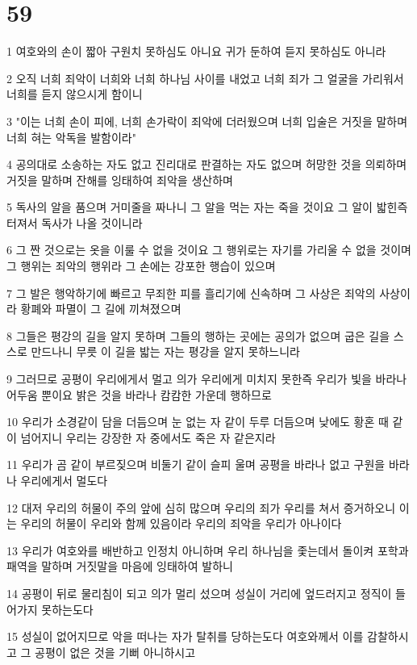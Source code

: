 \chapter{59}

\par 1 여호와의 손이 짧아 구원치 못하심도 아니요 귀가 둔하여 듣지 못하심도 아니라
\par 2 오직 너희 죄악이 너희와 너희 하나님 사이를 내었고 너희 죄가 그 얼굴을 가리워서 너희를 듣지 않으시게 함이니
\par 3 "이는 너희 손이 피에, 너희 손가락이 죄악에 더러웠으며 너희 입술은 거짓을 말하며 너희 혀는 악독을 발함이라"
\par 4 공의대로 소송하는 자도 없고 진리대로 판결하는 자도 없으며 허망한 것을 의뢰하며 거짓을 말하며 잔해를 잉태하여 죄악을 생산하며
\par 5 독사의 알을 품으며 거미줄을 짜나니 그 알을 먹는 자는 죽을 것이요 그 알이 밟힌즉 터져서 독사가 나올 것이니라
\par 6 그 짠 것으로는 옷을 이룰 수 없을 것이요 그 행위로는 자기를 가리울 수 없을 것이며 그 행위는 죄악의 행위라 그 손에는 강포한 행습이 있으며
\par 7 그 발은 행악하기에 빠르고 무죄한 피를 흘리기에 신속하며 그 사상은 죄악의 사상이라 황폐와 파멸이 그 길에 끼쳐졌으며
\par 8 그들은 평강의 길을 알지 못하며 그들의 행하는 곳에는 공의가 없으며 굽은 길을 스스로 만드나니 무릇 이 길을 밟는 자는 평강을 알지 못하느니라
\par 9 그러므로 공평이 우리에게서 멀고 의가 우리에게 미치지 못한즉 우리가 빛을 바라나 어두움 뿐이요 밝은 것을 바라나 캄캄한 가운데 행하므로
\par 10 우리가 소경같이 담을 더듬으며 눈 없는 자 같이 두루 더듬으며 낮에도 황혼 때 같이 넘어지니 우리는 강장한 자 중에서도 죽은 자 같은지라
\par 11 우리가 곰 같이 부르짖으며 비둘기 같이 슬피 울며 공평을 바라나 없고 구원을 바라나 우리에게서 멀도다
\par 12 대저 우리의 허물이 주의 앞에 심히 많으며 우리의 죄가 우리를 쳐서 증거하오니 이는 우리의 허물이 우리와 함께 있음이라 우리의 죄악을 우리가 아나이다
\par 13 우리가 여호와를 배반하고 인정치 아니하며 우리 하나님을 좇는데서 돌이켜 포학과 패역을 말하며 거짓말을 마음에 잉태하여 발하니
\par 14 공평이 뒤로 물리침이 되고 의가 멀리 섰으며 성실이 거리에 엎드러지고 정직이 들어가지 못하는도다
\par 15 성실이 없어지므로 악을 떠나는 자가 탈취를 당하는도다 여호와께서 이를 감찰하시고 그 공평이 없은 것을 기뻐 아니하시고
